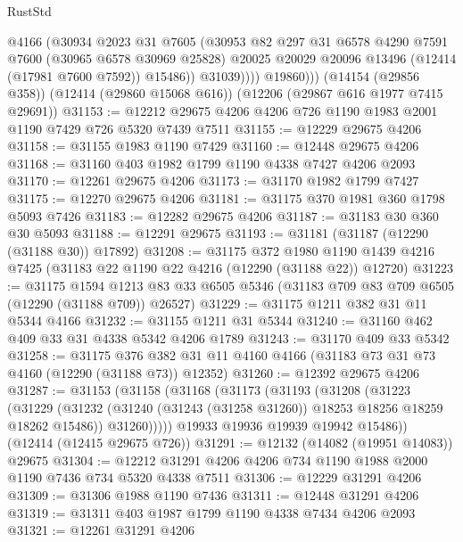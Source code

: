 \begin{lexlean}{RustStd}
\begin{coremodule}
                  @4166
                  (@30934
                    @2023
                    @31
                    @7605
                    (@30953
                      @82
                      @297
                      @31
                      @6578
                      @4290
                      @7591
                      @7600
                      (@30965 @6578 @30969 @25828)
                      @20025
                      @20029
                      @20096
                      @13496
                      (@12414 (@17981 @7600 @7592))
                      @15486))
                  @31039))))
          @19860)))
    (@14154 (@29856 @358))
    (@12414 (@29860 @15068 @616))
    (@12206 (@29867 @616 @1977 @7415 @29691))
@31153 := @12212 @29675 @4206 @4206 @726 @1190 @1983 @2001 @1190 @7429 @726 @5320 @7439 @7511
@31155 := @12229 @29675 @4206
@31158 := @31155 @1983 @1190 @7429
@31160 := @12448 @29675 @4206
@31168 := @31160 @403 @1982 @1799 @1190 @4338 @7427 @4206 @2093
@31170 := @12261 @29675 @4206
@31173 := @31170 @1982 @1799 @7427
@31175 := @12270 @29675 @4206
@31181 := @31175 @370 @1981 @360 @1798 @5093 @7426
@31183 := @12282 @29675 @4206
@31187 := @31183 @30 @360 @30 @5093
@31188 := @12291 @29675
@31193 := @31181 (@31187 (@12290 (@31188 @30)) @17892)
@31208 := @31175
    @372
    @1980
    @1190
    @1439
    @4216
    @7425
    (@31183 @22 @1190 @22 @4216 (@12290 (@31188 @22)) @12720)
@31223 := @31175
    @1594
    @1213
    @83
    @33
    @6505
    @5346
    (@31183 @709 @83 @709 @6505 (@12290 (@31188 @709)) @26527)
@31229 := @31175 @1211 @382 @31 @11 @5344 @4166
@31232 := @31155 @1211 @31 @5344
@31240 := @31160 @462 @409 @33 @31 @4338 @5342 @4206 @1789
@31243 := @31170 @409 @33 @5342
@31258 := @31175
    @376
    @382
    @31
    @11
    @4160
    @4166
    (@31183 @73 @31 @73 @4160 (@12290 (@31188 @73)) @12352)
@31260 := @12392 @29675 @4206
@31287 := @31153
    (@31158
      (@31168
        (@31173
          (@31193
            (@31208
              (@31223
                (@31229
                  (@31232 (@31240 (@31243 (@31258 @31260)) @18253 @18256 @18259 @18262 @15486))
                  @31260)))))
        @19933
        @19936
        @19939
        @19942
        @15486))
    (@12414 (@12415 @29675 @726))
@31291 := @12132 (@14082 (@19951 @14083)) @29675
@31304 := @12212 @31291 @4206 @4206 @734 @1190 @1988 @2000 @1190 @7436 @734 @5320 @4338 @7511
@31306 := @12229 @31291 @4206
@31309 := @31306 @1988 @1190 @7436
@31311 := @12448 @31291 @4206
@31319 := @31311 @403 @1987 @1799 @1190 @4338 @7434 @4206 @2093
@31321 := @12261 @31291 @4206

\end{coremodule}
\end{lexlean}
